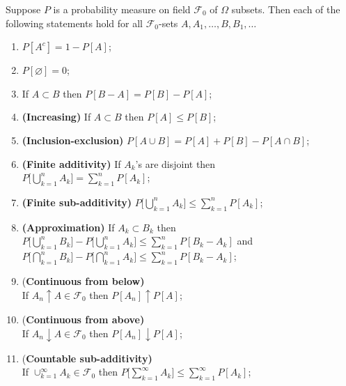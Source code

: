 \begin{theorem}
Suppose $P$ is a probability measure on field $\mathcal F_0$ of $\Omega$ subsets. Then each of the following statements hold for all $\mathcal F_0$-sets $A, A_1, \ldots, B, B_1, \ldots$
\begin{enumerate}
\item $P[A^c] = 1-P[A]$;
\item $P[\varnothing]=0$;
\item\label{bpfa one} If $A\subset B$ then $P[B-A]=P[B]-P[A]$;
\item\label{bpfa two} {\bf (Increasing)} If $A\subset B$ then  $P[A]\leq P[B]$;
\item\label{bpfa three} {\bf (Inclusion-exclusion)} $P[A\cup B] = P[A]+P[B]-P[A\cap B]$;
\item\label{bpfa four} {\bf (Finite additivity)}  If $A_k$'s are disjoint then
\\$P\bigl[ \bigcup_{k=1}^n A_k \bigr] = \sum_{k=1}^n P[A_k]$;
\item\label{bpfa five} {\bf (Finite sub-additivity)}  $P\bigl[ \bigcup_{k=1}^n A_k \bigr] \leq \sum_{k=1}^n P[A_k]$;
\item\label{bpfa six} {\bf (Approximation)} If $A_k\subset B_k$ then
\\$P\bigl[ \bigcup_{k=1}^n B_k \bigr] - P\bigl[ \bigcup_{k=1}^n A_k \bigr] \leq \sum_{k=1}^n P[B_k - A_k]$ and
$P\bigl[ \bigcap_{k=1}^n B_k \bigr] - P\bigl[ \bigcap_{k=1}^n A_k \bigr] \leq \sum_{k=1}^n P[B_k - A_k]$;
\item\label{bpfa seven}{(\bf Continuous from below)} \\ If  $A_n\uparrow A\in \mathcal F_0$ then $P[A_n]\uparrow P[A]$;
\item\label{bpfa eight}{(\bf Continuous from above)} \\ If $A_n\downarrow A\in \mathcal F_0$ then $P[A_n]\downarrow P[A]$;
\item\label{bpfa nine}{(\bf Countable sub-additivity)}\\  If $\cup_{k=1}^\infty A_k \in \mathcal F_0$  then $P\bigl[\sum_{k=1}^\infty A_k\bigr] \leq \sum_{k=1}^\infty P[A_k]$;
\end{enumerate}
\end{theorem}

